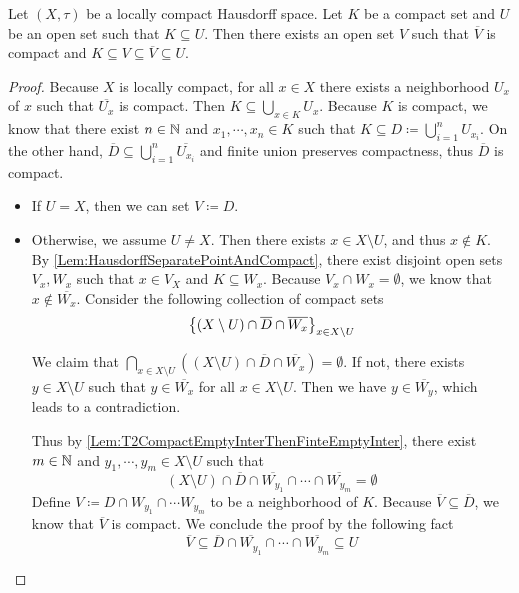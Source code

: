 \documentclass[screen,single]{techreport}
\numberwithin{equation}{section}
\begin{document}
\begin{lemma}\label{Lem:LocCompT2ThenNeighborContainCompactClosure}
	Let $(X,\tau)$ be a locally compact Hausdorff space.
	Let $K$ be a compact set and $U$ be an open set such that $K \subseteq U$.
	Then there exists an open set $V$ such that $\overline{V}$ is compact and $K \subseteq V \subseteq \overline{V} \subseteq U$.
\end{lemma}
\begin{proof}
	Because $X$ is locally compact, for all $x \in X$ there exists a neighborhood $U_x$ of $x$ such that $\overline{U_x}$ is compact.
	Then $K \subseteq \bigcup_{x \in K} U_x$.
	Because $K$ is compact, we know that there exist $n \in \mathbb{N}$ and $x_1,\cdots,x_n \in K$ such that $K \subseteq D \coloneqq \bigcup_{i=1}^n U_{x_i}$.
	On the other hand, $\overline{D} \subseteq \bigcup_{i=1}^n \overline{U_{x_i}}$ and finite union preserves compactness, thus $\overline{D}$ is compact.
	\begin{itemize}
		\item If $U = X$, then we can set $V \coloneqq D$.
		\item Otherwise, we assume $U \neq X$.
		Then there exists $x \in X \setminus U$, and thus $x \not\in K$.
		By \cref{Lem:HausdorffSeparatePointAndCompact}, there exist disjoint open sets $V_x,W_x$ such that $x \in V_X$ and $K \subseteq W_x$.
		Because $V_x \cap W_x = \emptyset$, we know that $x \not\in \overline{W_x}$.
		Consider the following collection of compact sets
		\[
		\left\{ { (X \setminus U) \cap \overline{D} \cap \overline{W_x} } \right\}_{x \in X \setminus U}
		\]
		
		We claim that $\bigcap_{x \in X \setminus U} ((X \setminus U) \cap \overline{D} \cap \overline{W_x}) = \emptyset$.
		If not, there exists $y \in X \setminus U$ such that $y \in \overline{W_x}$ for all $x \in X \setminus U$. Then we have $y \in \overline{W_y}$, which leads to a contradiction.
		
		Thus by \cref{Lem:T2CompactEmptyInterThenFinteEmptyInter}, there exist $m \in \mathbb{N}$ and $y_1,\cdots,y_m \in X \setminus U$ such that
		\[
		(X \setminus U) \cap \overline{D} \cap \overline{W_{y_1}} \cap \cdots \cap \overline{W_{y_m}} = \emptyset
		\]
		Define $V \coloneqq D \cap W_{y_1} \cap \cdots W_{y_m}$ to be a neighborhood of $K$.
		Because $\overline{V} \subseteq \overline{D}$, we know that $\overline{V}$ is compact.
		We conclude the proof by the following fact
		\[
		\overline{V} \subseteq \overline{D} \cap \overline{W_{y_1}} \cap \cdots \cap \overline{W_{y_m}} \subseteq U
		\]
	\end{itemize}
\end{proof}
\end{document}
